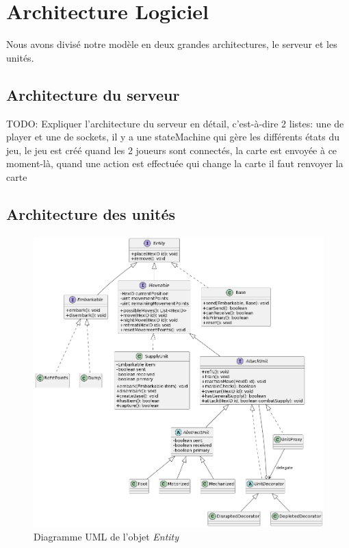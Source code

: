 

\section{Architecture Logiciel}

Nous avons divisé notre modèle en deux grandes architectures, le serveur et les unités.

\subsection{Architecture du serveur}

TODO: Expliquer l'architecture du serveur en détail, c'est-à-dire 2 listes: une de player et une de sockets, il y a une stateMachine qui gère les différents états du jeu,
le jeu est créé quand les 2 joueurs sont connectés, la carte est envoyée à  ce moment-là, quand une action est effectuée qui change la carte il faut renvoyer la carte

\subsection{Architecture des unités}

\begin{figure}[H]
    \centering
    \includegraphics[scale=0.3]{data/uml_entityV4.png}
    \caption{Diagramme UML de l'objet \emph{Entity}}
    \label{fig:uml_entity}
\end{figure}

